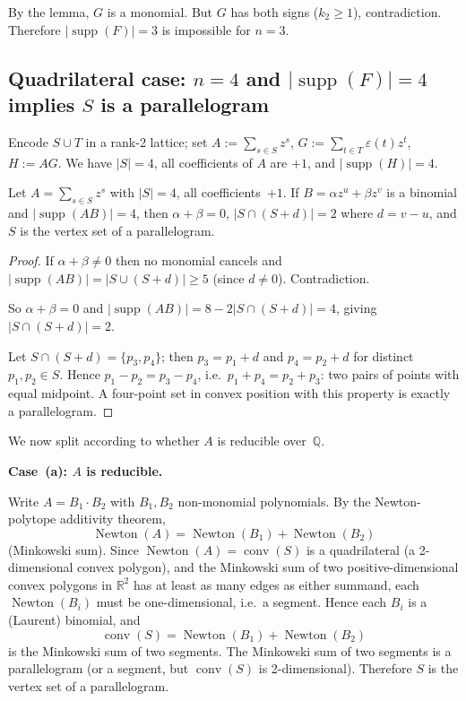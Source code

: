 By the lemma, \(G\) is a monomial.  But \(G\) has both signs (\(k_2\ge1\)), contradiction.
Therefore \(|\operatorname{supp}(F)|=3\) is impossible for \(n=3\).

\subsection*{Quadrilateral case: \(n=4\) and \(|\operatorname{supp}(F)|=4\) implies \(S\) is a parallelogram}

Encode \(S\cup T\) in a rank-2 lattice; set \(A:=\sum_{s\in S}z^s\), \(G:=\sum_{t\in T}\varepsilon(t)z^t\),
\(H:=AG\).  We have \(|S|=4\), all coefficients of \(A\) are \(+1\), and
\(|\operatorname{supp}(H)|=4\).

\begin{lemma}
Let \(A=\sum_{s\in S}z^s\) with \(|S|=4\), all coefficients~\(+1\).
If \(B=\alpha z^u+\beta z^v\) is a binomial and \(|{\operatorname{supp}}(AB)|=4\), then
\(\alpha+\beta=0\), \(|S\cap(S+d)|=2\) where \(d=v-u\),
and \(S\) is the vertex set of a parallelogram.
\end{lemma}

\begin{proof}
If \(\alpha+\beta\neq0\) then no monomial cancels and
\(|\operatorname{supp}(AB)|=|S\cup(S+d)|\ge5\) (since \(d\neq0\)).  Contradiction.

So \(\alpha+\beta=0\) and \(|\operatorname{supp}(AB)|=8-2|S\cap(S+d)|=4\), giving
\(|S\cap(S+d)|=2\).

Let \(S\cap(S+d)=\{p_3,p_4\}\); then \(p_3=p_1+d\) and \(p_4=p_2+d\) for distinct
\(p_1,p_2\in S\).  Hence \(p_1-p_2=p_3-p_4\), i.e.\ \(p_1+p_4=p_2+p_3\):
two pairs of points with equal midpoint.  A four-point set in convex position with this
property is exactly a parallelogram.
\end{proof}

We now split according to whether \(A\) is reducible over~\(\mathbb{Q}\).

\medskip
\textbf{Case~(a): \(A\) is reducible.}

Write \(A=B_1\cdot B_2\) with \(B_1,B_2\) non-monomial polynomials.
By the Newton-polytope additivity theorem,
\[
\operatorname{Newton}(A)=\operatorname{Newton}(B_1)+\operatorname{Newton}(B_2)
\]
(Minkowski sum).  Since \(\operatorname{Newton}(A)=\operatorname{conv}(S)\) is a quadrilateral
(a 2-dimensional convex polygon), and the Minkowski sum of two positive-dimensional
convex polygons in \(\mathbb{R}^2\) has at least as many edges as either summand,
each \(\operatorname{Newton}(B_i)\) must be one-dimensional, i.e.\ a segment.
Hence each \(B_i\) is a (Laurent) binomial, and
\[
\operatorname{conv}(S)=\operatorname{Newton}(B_1)+\operatorname{Newton}(B_2)
\]
is the Minkowski sum of two segments.  The Minkowski sum of two segments is a
parallelogram (or a segment, but \(\operatorname{conv}(S)\) is 2-dimensional).
Therefore \(S\) is the vertex set of a parallelogram.

